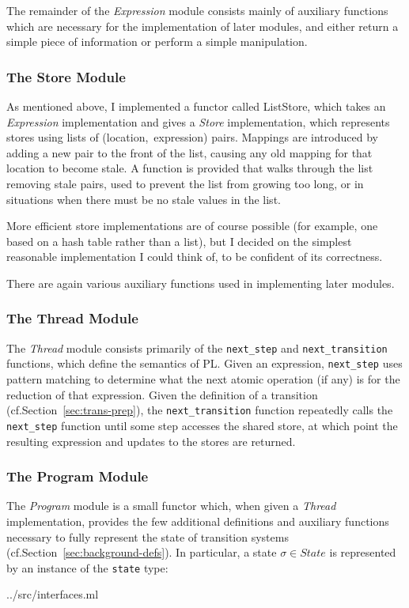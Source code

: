 \documentclass[12pt,a4paper,twoside,openright]{report}
\begin{document}
The remainder of the \emph{Expression} module
consists mainly of auxiliary functions which are
necessary for the implementation of later
modules, and either return a simple piece
of information or perform a simple manipulation.

\subsubsection{The Store Module}
As mentioned above, I implemented a functor
called ListStore, which takes an
\emph{Expression} implementation and
gives a \emph{Store} implementation, which
represents stores using lists of
(location,~expression) pairs. Mappings
are introduced by adding a new pair to
the front of the list, causing any old
mapping for that location to become stale.
A function is provided that walks through
the list removing stale pairs, used to
prevent the list from growing too long,
or in situations when there must be
no stale values in the list.

More efficient store implementations are of
course possible (for example, one based on
a hash table rather than a list), but
I decided on the simplest reasonable
implementation I could think of, to
be confident of its correctness.

There are again various auxiliary functions
used in implementing later modules.

\subsubsection{The Thread Module}
The \emph{Thread} module consists primarily of
the \texttt{next\_step} and \texttt{next\_transition}
functions, which define the semantics of PL.
Given an expression, \texttt{next\_step} uses pattern
matching to determine what the next atomic
operation (if any) is for the reduction
of that expression. Given the definition
of a transition (cf.\@ Section~\ref{sec:trans-prep}),
the \texttt{next\_transition}
function repeatedly calls the \texttt{next\_step}
function until some step accesses the shared
store, at which point the resulting expression
and updates to the stores are returned.

\subsubsection{The Program Module}
The \emph{Program} module is a small functor which,
when given a \emph{Thread} implementation, provides 
the few additional definitions and auxiliary
functions necessary to fully represent the state of
transition systems (cf.\@ Section~\ref{sec:background-defs}).
In particular, a state $\sigma \in \textit{State}$ is
represented by an instance of the \texttt{state} type:

	{../src/interfaces.ml}
\end{document}
